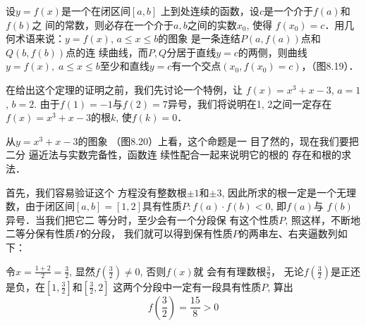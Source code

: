 设$y=f(x)$是一个在闭区间$[a,b]$
上到处连续的函数，设$c$是一个介于$f(a)$和$f(b)$之
间的常数，则必存在一个介于$a,b$之间的实数$x_0$, 使得
$f(x_0)=c$．用几何术语来说：$y=f(x)$, $a\le x\le b$的图象
是一条连结$P(a,f(a))$点和$Q(b,f(b))$点的连
续曲线，而$P,Q$分居于直线$y=c$的两侧，则曲线$y=
f(x),\; a\le x\le b$至少和直线$y=c$有一个交点$(x_0,
f(x_0)=c)$，（图8.19）．

\begin{figure}[htp]
    \centering
{}
    \caption{}
\end{figure}


在给出这个定理的证明之前，我们先讨论一个特例，让
$f(x)=x^3+x-3$, $a=1$, $b=2$. 由于$f(1)=-1$与$f(2)=7$异号，我们将说明在1,
2之间一定存在$f(x)=x^3+x-3$的根$k$, 使$f(k)=0$．

从$y=x^3+x-3$的图象
（图8.20）上看，这个命题是一
目了然的，现在我们要把二分
逼近法与实数完备性，函数连
续性配合一起来说明它的根的
存在和根的求法．

\begin{figure}[htp]
    \centering
{}
    \caption{}
\end{figure}


首先，我们容易验证这个
方程没有整数根$\pm 1$和$\pm 3$, 
因此所求的根一定是一个无理
数，由于闭区间$[a,b]=
[1,2]$具有性质$P:f(a)\cdot f(b)<0$, 即$f(a)$与
$f(b)$异号．当我们把它二
等分时，至少会有一个分段保
有这个性质$P$, 照这样，不断地二等分保有性质$P$的分段，
我们就可以得到保有性质$P$的两串左、右夹逼数列如下：

令$x=\frac{1+2}{2}=\frac{3}{2}$, 
显然$f\left(\frac{3}{2}\right)\ne 0$, 否则$f(x)$就
会有有理数根$\frac{3}{2}$，
无论$f\left(\frac{3}{2}\right)$是正还是负，在$\left[1,\frac{3}{2}\right]$和$\left[\frac{3}{2},2\right]$
这两个分段中一定有一段具有性质$P$, 算出
\[f\left(\frac{3}{2}\right)=\frac{15}{8}>0\]

